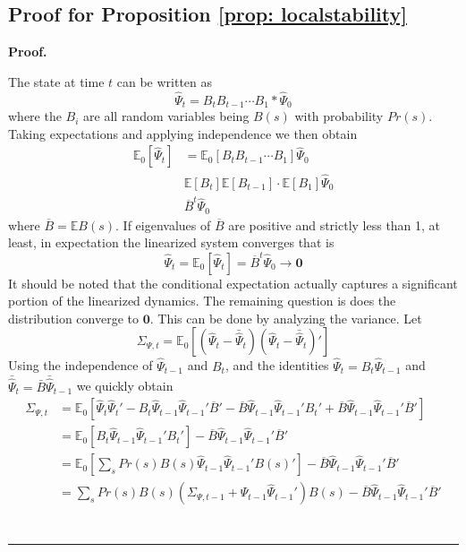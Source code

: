 \documentclass[thmsb,11pt]{article}
\newenvironment{proof}[1][Proof]{\noindent \textbf{#1.} }{\  \rule{0.5em}{0.5em}}
\begin{document}
\subsection{Proof for Proposition \ref{prop: localstability}}
 \begin{proof}
 
 The state at time $t$ can be written as
 	\[
 		\hat{\Psi}_t = B_tB_{t-1}\cdots B_1*\hat{\Psi}_0
 	\]where the $B_i$ are all random variables being $B(s)$ with probability $Pr(s)$. Taking expectations and applying independence we then obtain
% 	
 	\begin{align}
 	\mathbb{E}_0[\hat{\Psi}_t] &= \mathbb{E}_0[B_tB_{t-1}\cdots B_1] \hat{\Psi}_0\\
 	&\mathbb{E}[B_t] \mathbb{E}[B_{t-1}]\cdot\mathbb{E}[B_1] \hat{\Psi}_0\\
 	&\overline B^t \hat{\Psi}_0
 	\end{align}
 	where $\overline B = \mathbb{E}B(s)$.  If eigenvalues of $\overline B$ are positive and strictly less than 1, at least, in expectation the linearized system converges that is
 	\begin{equation}
 		 \hat{\Psi}_t = \mathbb{E}_0[\hat{\Psi}_t] = \overline {B}^t \hat{\Psi}_0\to\bm 0
 	\end{equation}It should be noted that the conditional expectation actually captures a significant portion of the linearized dynamics.  
	The remaining question is does the distribution converge to $\bm 0$.  This can be done by analyzing the variance.  Let 
 	\[
 		\Sigma_{\Psi,t} = \mathbb{E}_0\left[(\hat{\Psi}_t-\bar \hat{\Psi}_t)(\hat{\Psi}_t-\bar \hat{\Psi}_t)'\right]
 	\]  Using the independence of $\hat{\Psi}_{t-1}$ and $B_t$, and the identities $\hat{\Psi}_t = B_t \hat{\Psi}_{t-1}$ and $\bar \hat{\Psi}_t = \bar B \bar \hat{\Psi}_{t-1}$ we quickly obtain
 	\begin{align}
 		\Sigma_{\Psi,t} &= \mathbb{E}_0\left[\hat{\Psi}_t\hat{\Psi}_t'-B_t \hat{\Psi}_{t-1}\hat{\Psi}_{t-1}'\overline B'-\overline B \hat{\Psi}_{t-1}\hat{\Psi}_{t-1}'B_t'+\overline B\hat{\Psi}_{t-1}\hat{\Psi}_{t-1}'\overline B'\right]\nonumber\\
 		&=\mathbb{E}_0[B_t \hat{\Psi}_{t-1}\hat{\Psi}_{t-1}'B_t']-\overline B\hat{\Psi}_{t-1}\hat{\Psi}_{t-1}'\overline B'\nonumber\\
 		&=\mathbb{E}_0[\sum_s Pr(s) B(s) \hat{\Psi}_{t-1}\hat{\Psi}_{t-1}' B(s)']-\overline B\hat{\Psi}_{t-1}\hat{\Psi}_{t-1}'\overline B'\nonumber\\
 		&=\sum_s Pr(s) B(s)(\Sigma_{\Psi,t-1}+\hat{\Psi}_{t-1}\hat{\Psi}_{t-1}')B(s)-\overline B\hat{\Psi}_{t-1}\hat{\Psi}_{t-1}'\overline B'\nonumber\\

\end{align}
\end{proof}
\end{document}
